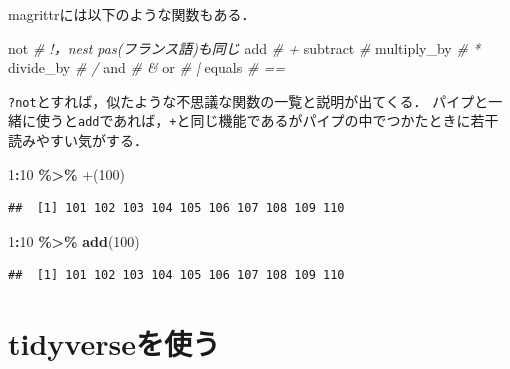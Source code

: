 \documentclass[
]{article}
\newenvironment{Shaded}{\begin{snugshade}}{\end{snugshade}}
\newcommand{\AttributeTok}[1]{\textcolor[rgb]{0.13,0.29,0.53}{#1}}
\newcommand{\CommentTok}[1]{\textcolor[rgb]{0.56,0.35,0.01}{\textit{#1}}}
\newcommand{\DecValTok}[1]{\textcolor[rgb]{0.00,0.00,0.81}{#1}}
\newcommand{\FunctionTok}[1]{\textcolor[rgb]{0.13,0.29,0.53}{\textbf{#1}}}
\newcommand{\NormalTok}[1]{#1}
\newcommand{\SpecialCharTok}[1]{\textcolor[rgb]{0.81,0.36,0.00}{\textbf{#1}}}
\newcommand{\StringTok}[1]{\textcolor[rgb]{0.31,0.60,0.02}{#1}}
\begin{document}
magrittrには以下のような関数もある．

\begin{Shaded}
\begin{Highlighting}[]
\NormalTok{not          }\CommentTok{\# \textasciigrave{}!\textasciigrave{}，\textasciigrave{}n\textquotesingle{}est pas\textasciigrave{}(フランス語)も同じ}
\NormalTok{add          }\CommentTok{\# \textasciigrave{}+\textasciigrave{}}
\NormalTok{subtract     }\CommentTok{\# \textasciigrave{}{-}\textasciigrave{}}
\NormalTok{multiply\_by  }\CommentTok{\# \textasciigrave{}*\textasciigrave{}}
\NormalTok{divide\_by    }\CommentTok{\# \textasciigrave{}/\textasciigrave{}}
\NormalTok{and          }\CommentTok{\# \textasciigrave{}\&\textasciigrave{}}
\NormalTok{or           }\CommentTok{\# \textasciigrave{}|\textasciigrave{}}
\NormalTok{equals       }\CommentTok{\# \textasciigrave{}==\textasciigrave{}}
\end{Highlighting}
\end{Shaded}

\texttt{?not}とすれば，似たような不思議な関数の一覧と説明が出てくる．
パイプと一緒に使うと\texttt{add}であれば，\texttt{+}と同じ機能であるがパイプの中でつかたときに若干読みやすい気がする．

\begin{Shaded}
\begin{Highlighting}[]
\DecValTok{1}\SpecialCharTok{:}\DecValTok{10} \SpecialCharTok{\%\textgreater{}\%} \StringTok{\textasciigrave{}}\AttributeTok{+}\StringTok{\textasciigrave{}}\NormalTok{(}\DecValTok{100}\NormalTok{)}
\end{Highlighting}
\end{Shaded}

\begin{verbatim}
##  [1] 101 102 103 104 105 106 107 108 109 110
\end{verbatim}

\begin{Shaded}
\begin{Highlighting}[]
\DecValTok{1}\SpecialCharTok{:}\DecValTok{10} \SpecialCharTok{\%\textgreater{}\%} \FunctionTok{add}\NormalTok{(}\DecValTok{100}\NormalTok{)}
\end{Highlighting}
\end{Shaded}

\begin{verbatim}
##  [1] 101 102 103 104 105 106 107 108 109 110
\end{verbatim}

\hypertarget{tidyverse}{%
\section{tidyverseを使う}\label{tidyverse}}
\end{document}
